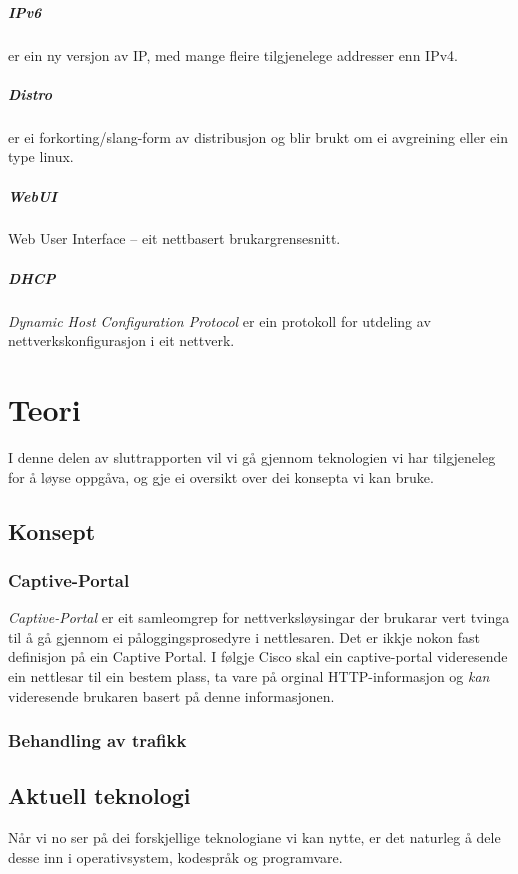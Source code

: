 \documentclass[nynorsk,12pt,a4paper,oneside]{book}
\begin{document}
\paragraph{IPv6} er ein ny versjon av IP, med mange fleire tilgjenelege addresser enn IPv4. 
\paragraph{Distro} er ei forkorting/slang-form av distribusjon og blir brukt om ei avgreining eller ein type linux.
\paragraph{WebUI} Web User Interface -- eit nettbasert brukargrensesnitt. 
\paragraph{DHCP} \emph{Dynamic Host Configuration Protocol} er ein protokoll for utdeling av nettverkskonfigurasjon i eit nettverk. 

\chapter{Teori}
I denne delen av sluttrapporten vil vi gå gjennom teknologien vi har tilgjeneleg for å løyse oppgåva, og gje ei oversikt over dei konsepta vi kan bruke. 

\section{Konsept}
\subsection{Captive-Portal}
\emph{Captive-Portal} er eit samleomgrep for nettverksløysingar der brukarar vert tvinga til å gå gjennom ei påloggingsprosedyre i nettlesaren. Det er ikkje nokon fast definisjon på ein Captive Portal. I følgje Cisco skal ein captive-portal videresende ein nettlesar til ein bestem plass, ta vare på orginal HTTP-informasjon og \emph{kan} videresende brukaren basert på denne informasjonen. \cite{ciscoCP}

\subsection{Behandling av trafikk}

\section{Aktuell teknologi}
Når vi no ser på dei forskjellige teknologiane vi kan nytte, er det naturleg å dele desse inn i operativsystem, kodespråk og programvare. 
\end{document}
